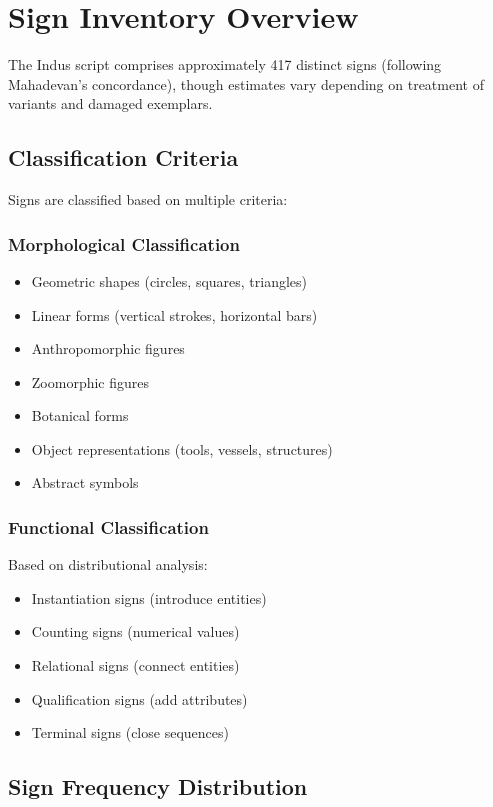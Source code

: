 \section{Sign Inventory Overview}

The Indus script comprises approximately 417 distinct signs (following Mahadevan's concordance), though estimates vary depending on treatment of variants and damaged exemplars.

\subsection{Classification Criteria}

Signs are classified based on multiple criteria:

\subsubsection{Morphological Classification}
\begin{itemize}
    \item Geometric shapes (circles, squares, triangles)
    \item Linear forms (vertical strokes, horizontal bars)
    \item Anthropomorphic figures
    \item Zoomorphic figures
    \item Botanical forms
    \item Object representations (tools, vessels, structures)
    \item Abstract symbols
\end{itemize}

\subsubsection{Functional Classification}
Based on distributional analysis:
\begin{itemize}
    \item Instantiation signs (introduce entities)
    \item Counting signs (numerical values)
    \item Relational signs (connect entities)
    \item Qualification signs (add attributes)
    \item Terminal signs (close sequences)
\end{itemize}

\subsection{Sign Frequency Distribution}

